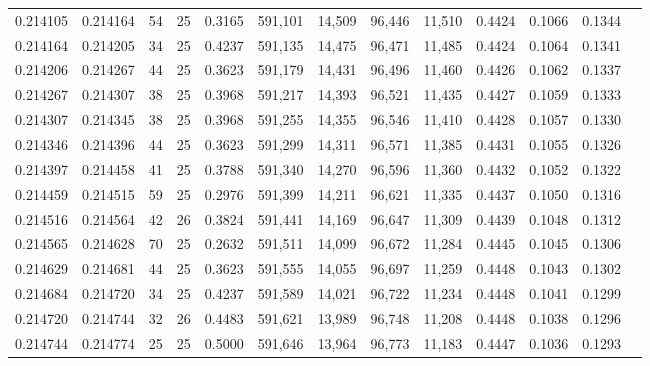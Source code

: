 \begin{tabular}{rrrrrrrrrrrrr}
0.214105 & 0.214164 &  54 &  25 &                                     0.3165 & 591,101 &  14,509 &  96,446 &  11,510 & 0.4424 & 0.1066 & 0.1344 \\
0.214164 & 0.214205 &  34 &  25 &                                     0.4237 & 591,135 &  14,475 &  96,471 &  11,485 & 0.4424 & 0.1064 & 0.1341 \\
0.214206 & 0.214267 &  44 &  25 &                                     0.3623 & 591,179 &  14,431 &  96,496 &  11,460 & 0.4426 & 0.1062 & 0.1337 \\
0.214267 & 0.214307 &  38 &  25 &                                     0.3968 & 591,217 &  14,393 &  96,521 &  11,435 & 0.4427 & 0.1059 & 0.1333 \\
0.214307 & 0.214345 &  38 &  25 &                                     0.3968 & 591,255 &  14,355 &  96,546 &  11,410 & 0.4428 & 0.1057 & 0.1330 \\
0.214346 & 0.214396 &  44 &  25 &                                     0.3623 & 591,299 &  14,311 &  96,571 &  11,385 & 0.4431 & 0.1055 & 0.1326 \\
0.214397 & 0.214458 &  41 &  25 &                                     0.3788 & 591,340 &  14,270 &  96,596 &  11,360 & 0.4432 & 0.1052 & 0.1322 \\
0.214459 & 0.214515 &  59 &  25 &                                     0.2976 & 591,399 &  14,211 &  96,621 &  11,335 & 0.4437 & 0.1050 & 0.1316 \\
0.214516 & 0.214564 &  42 &  26 &                                     0.3824 & 591,441 &  14,169 &  96,647 &  11,309 & 0.4439 & 0.1048 & 0.1312 \\
0.214565 & 0.214628 &  70 &  25 &                                     0.2632 & 591,511 &  14,099 &  96,672 &  11,284 & 0.4445 & 0.1045 & 0.1306 \\
0.214629 & 0.214681 &  44 &  25 &                                     0.3623 & 591,555 &  14,055 &  96,697 &  11,259 & 0.4448 & 0.1043 & 0.1302 \\
0.214684 & 0.214720 &  34 &  25 &                                     0.4237 & 591,589 &  14,021 &  96,722 &  11,234 & 0.4448 & 0.1041 & 0.1299 \\
0.214720 & 0.214744 &  32 &  26 &                                     0.4483 & 591,621 &  13,989 &  96,748 &  11,208 & 0.4448 & 0.1038 & 0.1296 \\
0.214744 & 0.214774 &  25 &  25 &                                     0.5000 & 591,646 &  13,964 &  96,773 &  11,183 & 0.4447 & 0.1036 & 0.1293 \\

\end{tabular}
